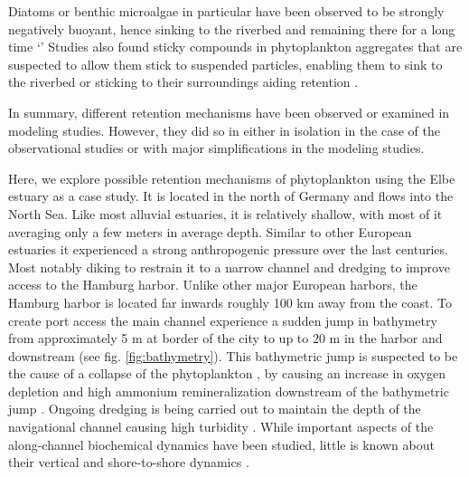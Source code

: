 \documentclass[npg, manuscript]{copernicus}
\begin{document}
Diatoms or benthic microalgae in particular have been observed to be strongly negatively buoyant, hence sinking to the riverbed and remaining there for a long time \citep{Passow1991,ThomasAnderson1998}`'
Studies also found sticky compounds in phytoplankton aggregates that are suspected to allow them stick to suspended particles, enabling them to sink to the riverbed or sticking to their surroundings aiding retention \citep{Kiørboe1993,VanderLee2000}.

In summary, different retention mechanisms have been observed or examined in modeling studies.
However, they did so in either in isolation in the case of the observational studies or with major simplifications in the modeling studies.


Here, we explore possible retention mechanisms of phytoplankton using the Elbe estuary as a case study.
It is located in the north of Germany and flows into the North Sea.
Like most alluvial estuaries, it is relatively shallow, with most of it averaging only a few meters in average depth.
Similar to other European estuaries it experienced a strong anthropogenic pressure over the last centuries.
Most notably diking to restrain it to a narrow channel and dredging to improve access to the Hamburg harbor.
Unlike other major European harbors, the Hamburg harbor is located far inwards roughly 100 \unit{km} away from the coast.
To create port access the main channel experience a sudden jump in bathymetry from approximately 5 \unit{m} at border of the city to up to 20 \unit{m} in the harbor and downstream (see fig. \ref{fig:bathymetry}). 
This bathymetric jump is suspected to be the cause of a collapse of the phytoplankton , by causing an increase in oxygen depletion and high ammonium remineralization downstream of the bathymetric jump \citep{Schroeder1997,Holzwarth2018,Sanders2018}.
Ongoing dredging is being carried out to maintain the depth of the navigational channel causing high turbidity \citep{Kappenberg2001}.
While important aspects of the along-channel biochemical dynamics have been studied, little is known about their vertical and shore-to-shore dynamics \citep{Goosen1999, Dahnke2008, Sanders2018}.
\end{document}
